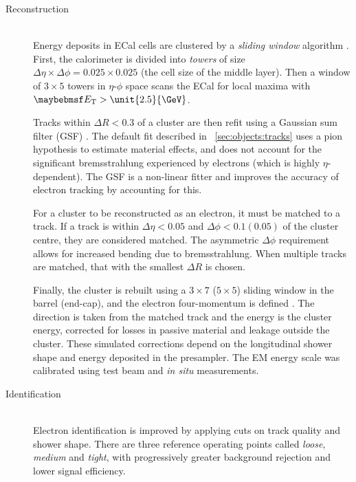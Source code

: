 \begin{description}
\item[Reconstruction] \hfill \\
	Energy deposits in ECal cells are clustered by a \textit{sliding window} 
	algorithm \cite{ElectronPerf:Expect}. First, the calorimeter is divided into 
	\textit{towers} of size $\Delta\eta \times \Delta\phi = 0.025 \times 0.025$ (the 
	cell size of the middle layer). Then a window of $3 \times 5$ towers in $\eta$-$\phi$ 
	space scans the ECal for local maxima with $\et > \unit{2.5}{\GeV}$.

	Tracks within $\Delta R < 0.3$ of a cluster are then refit using a Gaussian sum 
	filter (GSF) \cite{Electron:GSF}. The default fit described in 
	\Section~\ref{sec:objects:tracks} uses a pion hypothesis to estimate material 
	effects, and does not account for the significant bremsstrahlung experienced by 
	electrons (which is highly $\eta$-dependent). The GSF is a non-linear fitter and 
	improves the accuracy of electron tracking by accounting for this.

	For a cluster to be reconstructed as an electron, it must be matched to a track. If a 
	track is within $\Delta\eta < 0.05$ and $\Delta\phi < 0.1 (0.05)$ of the cluster 
	centre, they are considered matched. The asymmetric $\Delta\phi$ requirement allows 
	for increased bending due to bremsstrahlung. When multiple tracks are matched, that 
	with the smallest $\Delta R$ is chosen.

	Finally, the cluster is rebuilt using a $3 \times 7$ ($5 \times 5$) sliding window 
	in the barrel (end-cap), and the electron four-momentum is defined 
	\cite{ElectronPerf:2010}. The direction is taken from the matched track and the 
	energy is the cluster energy, corrected for losses in passive material and leakage 
	outside the cluster. These simulated corrections depend on the longitudinal shower 
	shape and energy deposited in the presampler. The EM energy scale was calibrated
	using test beam and \textit{in situ} \HepProcess{\PZ \HepTo \Pe\Pe} measurements.

\item[Identification] \hfill \\
	Electron identification is improved by applying cuts on track quality and shower 
	shape. There are three reference operating points called \textit{loose}, 
	\textit{medium} and \textit{tight}, with progressively greater background rejection 
	and lower signal efficiency.
	

\end{description}

